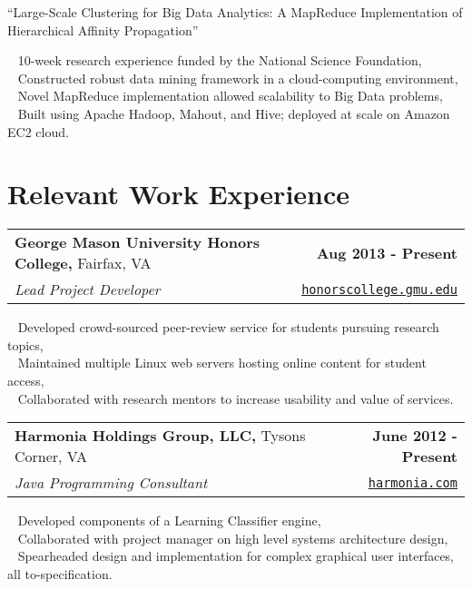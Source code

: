 \documentclass[letterpaper]{article}
\newcommand{\detail}{\indent\textbullet ~ }
\begin{document}
  \noindent\begin{center}``Large-Scale Clustering for Big Data Analytics: A MapReduce Implementation of Hierarchical Affinity Propagation''\end{center}

  \detail 10-week research experience funded by the National Science Foundation,\\
  \detail Constructed robust data mining framework in a cloud-computing environment,\\
  \detail Novel MapReduce implementation allowed scalability to Big Data problems,\\
  \detail Built using Apache Hadoop, Mahout, and Hive; deployed at scale on Amazon EC2 cloud.


  \section{Relevant Work Experience}

  \noindent
  \begin{tabularx}{\textwidth}{@{}X r@{}}
    \textbf{George Mason University Honors College,} Fairfax, VA & \textbf{Aug 2013 - Present} \\
    \emph{Lead Project Developer} & \texttt{\href{http://honorscollege.gmu.edu/collegeresearch}{honorscollege.gmu.edu}} \\[0.2cm]
  \end{tabularx}

  \detail Developed crowd-sourced peer-review service for students pursuing research topics,\\
  \detail Maintained multiple Linux web servers hosting online content for student access,\\
  \detail Collaborated with research mentors to increase usability and value of services.\\

  \noindent
  \begin{tabularx}{\textwidth}{@{}X r@{}}
    \textbf{Harmonia Holdings Group, LLC,} Tysons Corner, VA & \textbf{June 2012 - Present} \\
    \emph{Java Programming Consultant} & \texttt{\href{harmonia.com}{harmonia.com}} \\[0.2cm]
  \end{tabularx}

  \detail Developed components of a Learning Classifier engine,\\
  \detail Collaborated with project manager on high level systems architecture design,\\
  \detail Spearheaded design and implementation for complex graphical user interfaces, all to-specification.
\end{document}
